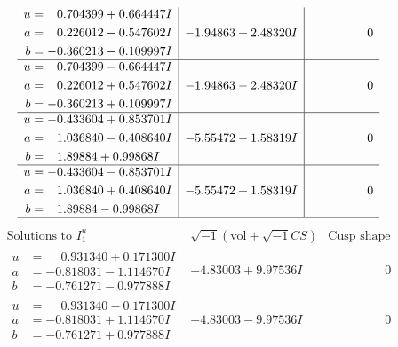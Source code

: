 \documentclass[1p]{elsarticle_modified}
\theoremstyle{definition}
\newcommand{\I}{\sqrt{-1}}
\begin{document}
$$\begin{array}{c|c|c}
\begin{aligned}
u &= \phantom{-}0.704399 + 0.664447 I \\
a &= \phantom{-}0.226012 - 0.547602 I \\
b &= -0.360213 - 0.109997 I\end{aligned}
 & -1.94863 + 2.48320 I & \phantom{-0.000000 } 0 \\ \hline\begin{aligned}
u &= \phantom{-}0.704399 - 0.664447 I \\
a &= \phantom{-}0.226012 + 0.547602 I \\
b &= -0.360213 + 0.109997 I\end{aligned}
 & -1.94863 - 2.48320 I & \phantom{-0.000000 } 0 \\ \hline\begin{aligned}
u &= -0.433604 + 0.853701 I \\
a &= \phantom{-}1.036840 - 0.408640 I \\
b &= \phantom{-}1.89884 + 0.99868 I\end{aligned}
 & -5.55472 - 1.58319 I & \phantom{-0.000000 } 0 \\ \hline\begin{aligned}
u &= -0.433604 - 0.853701 I \\
a &= \phantom{-}1.036840 + 0.408640 I \\
b &= \phantom{-}1.89884 - 0.99868 I\end{aligned}
 & -5.55472 + 1.58319 I & \phantom{-0.000000 } 0\\
 \hline 
 \end{array}$$\newpage$$\begin{array}{c|c|c}  
\text{Solutions to }I^u_{1}& \I (\text{vol} + \sqrt{-1}CS) & \text{Cusp shape}\\
 \hline 
\begin{aligned}
u &= \phantom{-}0.931340 + 0.171300 I \\
a &= -0.818031 - 1.114670 I \\
b &= -0.761271 - 0.977888 I\end{aligned}
 & -4.83003 + 9.97536 I & \phantom{-0.000000 } 0 \\ \hline\begin{aligned}
u &= \phantom{-}0.931340 - 0.171300 I \\
a &= -0.818031 + 1.114670 I \\
b &= -0.761271 + 0.977888 I\end{aligned}
 & -4.83003 - 9.97536 I & \phantom{-0.000000 } 0 \\ \hline\begin{aligned}

\end{aligned}
\end{array}$$
\end{document}

